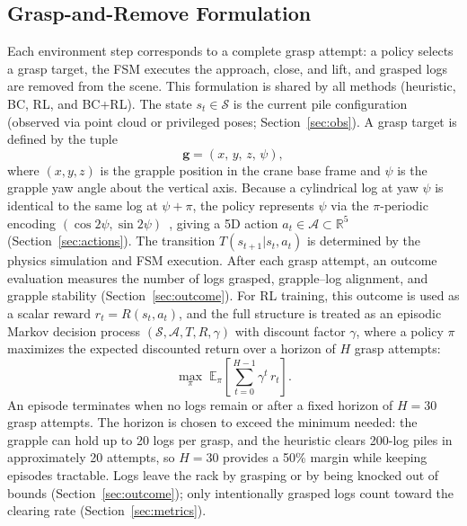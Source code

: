\documentclass[conference]{IEEEtran}
\begin{document}
\subsection{Grasp-and-Remove Formulation}
\label{sec:formulation}
Each environment step corresponds to a complete grasp attempt: a policy selects a grasp target, the FSM executes the approach, close, and lift, and grasped logs are removed from the scene.
This formulation is shared by all methods (heuristic, BC, RL, and BC+RL).
The state $s_t \in \mathcal{S}$ is the current pile configuration (observed via point cloud or privileged poses; Section~\ref{sec:obs}).
A grasp target is defined by the tuple
\begin{equation}
    \mathbf{g} = (x,\, y,\, z,\, \psi),
\end{equation}
where $(x, y, z)$ is the grapple position in the crane base frame and $\psi$ is the grapple yaw angle about the vertical axis.
Because a cylindrical log at yaw $\psi$ is identical to the same log at $\psi + \pi$, the policy represents $\psi$ via the $\pi$-periodic encoding $(\cos 2\psi, \sin 2\psi)$~\cite{morrison2018closing}, giving a 5D action $a_t \in \mathcal{A} \subset \mathbb{R}^5$ (Section~\ref{sec:actions}).
The transition $T(s_{t+1}|s_t, a_t)$ is determined by the physics simulation and FSM execution.
After each grasp attempt, an outcome evaluation measures the number of logs grasped, grapple--log alignment, and grapple stability (Section~\ref{sec:outcome}).
For RL training, this outcome is used as a scalar reward $r_t = R(s_t, a_t)$, and the full structure is treated as an episodic Markov decision process $(\mathcal{S}, \mathcal{A}, T, R, \gamma)$ with discount factor $\gamma$, where a policy $\pi$ maximizes the expected discounted return over a horizon of $H$ grasp attempts:
\begin{equation}
    \max_\pi \; \mathbb{E}_\pi \!\left[\sum_{t=0}^{H-1} \gamma^t \, r_t \right].
\end{equation}
An episode terminates when no logs remain or after a fixed horizon of $H=30$ grasp attempts.
The horizon is chosen to exceed the minimum needed: the grapple can hold up to 20 logs per grasp, and the heuristic clears 200-log piles in approximately 20 attempts, so $H=30$ provides a 50\% margin while keeping episodes tractable.
Logs leave the rack by grasping or by being knocked out of bounds (Section~\ref{sec:outcome}); only intentionally grasped logs count toward the clearing rate (Section~\ref{sec:metrics}).
\end{document}
